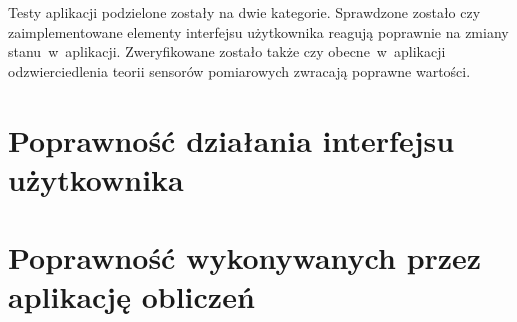 Testy aplikacji podzielone zostały na dwie kategorie. Sprawdzone zostało czy zaimplementowane
elementy interfejsu użytkownika reagują poprawnie na zmiany stanu~w~aplikacji. Zweryfikowane zostało
także czy obecne~w~aplikacji odzwierciedlenia teorii sensorów pomiarowych zwracają poprawne
wartości.

\section{Poprawność działania interfejsu użytkownika}


\section{Poprawność wykonywanych przez aplikację obliczeń}
